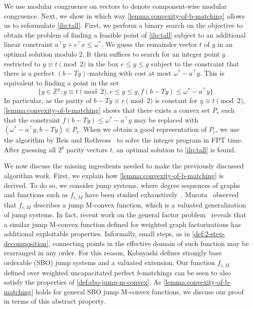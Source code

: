 \documentclass[a4paper,UKenglish,cleveref,thm-restate]{lipics-v2021}
\newcommand{\Z}{\mathbb Z}
\begin{document}
We use modular congruence on vectors to denote component-wise modular congruence. Next, we show in which way \cref{lemma:convexity-of-b-matching} allows us to reformulate \cref{ilp:tall}. First, we perform a binary search on the objective to obtain the problem of finding a feasible point of \cref{ilp:tall} subject to an additional linear constraint $a^\top y+c^\top x\le\omega^*$. We guess the remainder vector $t$ of $y$ in an optimal solution modulo $2$. It then suffices to search for an integer point $y$ restricted to $y\equiv t\pmod2$ in the box $e\le y\le g$ subject to the constraint that there is a perfect $(b-Ty)$-matching with cost at most $\omega^*-a^\top y$. This is equivalent to finding a point in the set
\[
    \{y\in\Z^p:y\equiv t\pmod2,e\le y\le g,f(b-Ty)\le\omega^*-a^\top y\}.
\]
In particular, as the parity of $b-Ty\equiv r\pmod2$ is constant for $y\equiv t\pmod2$, \cref{lemma:convexity-of-b-matching} shows that there exists a convex set $P_r$ such that the constraint $f(b-Ty)\le\omega^*-a^\top y$ may be replaced with $(\omega^*-a^\top y,b-Ty)\in P_r$. When we obtain a good representation of $P_r$, we use the algorithm by Reis and Rothvoss~\cite{DBLP:conf/focs/ReisR23} to solve the integer program in FPT time. After guessing all $2^p$ parity vectors $t$, an optimal solution to \cref{ilp:tall} is found.

We now discuss the missing ingredients needed to make the previously discussed algorithm work. First, we explain how \cref{lemma:convexity-of-b-matching} is derived. To do so, we consider jump systems, where degree sequences of graphs and functions such as $f_{c,M}$ have been studied exhaustively~\cite{DBLP:journals/siamdm/BouchetC95,DBLP:journals/siamdm/Murota06,DBLP:journals/ieicet/MurotaT06,DBLP:conf/ipco/Kobayashi23}. Murota~\cite{DBLP:journals/ieicet/MurotaT06} observed that $f_{c,M}$ describes a jump M-convex function, which is a valuated generalization of jump systems. In fact, recent work on the general factor problem~\cite{DBLP:conf/ipco/Kobayashi23} reveals that a similar jump M-convex function defined for weighted graph factorizations has additional exploitable properties. Informally, small steps, as in \cref{def:2-step-decomposition}, connecting points in the effective domain of such function may be rearranged in any order. For this reason, Kobayashi defines strongly base orderable (SBO) jump systems and a valuated extension. Our function $f_{c,M}$ defined over weighted uncapacitated perfect $b$-matchings can be seen to also satisfy the properties of \cref{def:sbo-jump-m-convex}. As \cref{lemma:convexity-of-b-matching} holds for general SBO jump M-convex functions, we discuss our proof in terms of this abstract property.
\end{document}
